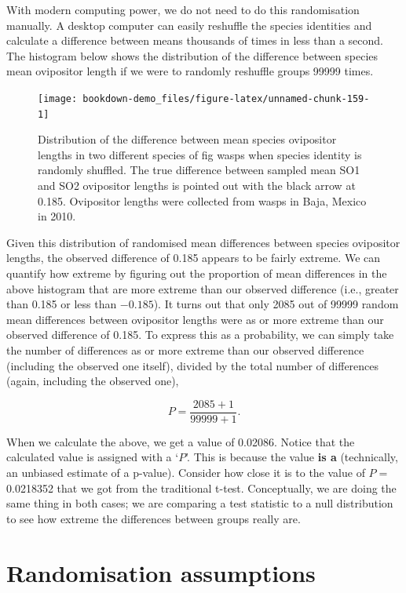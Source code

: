\documentclass[
  openany]{krantz}
\begin{document}
With modern computing power, we do not need to do this randomisation manually.
A desktop computer can easily reshuffle the species identities and calculate a difference between means thousands of times in less than a second.
The histogram below shows the distribution of the difference between species mean ovipositor length if we were to randomly reshuffle groups 99999 times.

\begin{figure}
\texttt{[image: bookdown-demo\_files/figure-latex/unnamed-chunk-159-1]} \caption{Distribution of the difference between mean species ovipositor lengths in two different species of fig wasps when species identity is randomly shuffled. The true difference between sampled mean SO1 and SO2 ovipositor lengths is pointed out with the black arrow at 0.185. Ovipositor lengths were collected from wasps in Baja, Mexico in 2010.}\label{fig:unnamed-chunk-159}
\end{figure}

Given this distribution of randomised mean differences between species ovipositor lengths, the observed difference of 0.185 appears to be fairly extreme.
We can quantify how extreme by figuring out the proportion of mean differences in the above histogram that are more extreme than our observed difference (i.e., greater than 0.185 or less than \(-0.185\)).
It turns out that only 2085 out of 99999 random mean differences between ovipositor lengths were as or more extreme than our observed difference of 0.185.
To express this as a probability, we can simply take the number of differences as or more extreme than our observed difference (including the observed one itself), divided by the total number of differences (again, including the observed one),

\[P = \frac{2085 + 1}{99999 + 1}.\]

When we calculate the above, we get a value of 0.02086.
Notice that the calculated value is assigned with a `\(P\)'.
This is because the value \textbf{is a } (technically, an unbiased estimate of a p-value). Consider how close it is to the value of \(P =\) 0.0218352 that we got from the traditional t-test.
Conceptually, we are doing the same thing in both cases; we are comparing a test statistic to a null distribution to see how extreme the differences between groups really are.

\hypertarget{randomisation-assumptions}{%
\section{Randomisation assumptions}\label{randomisation-assumptions}}
\end{document}
